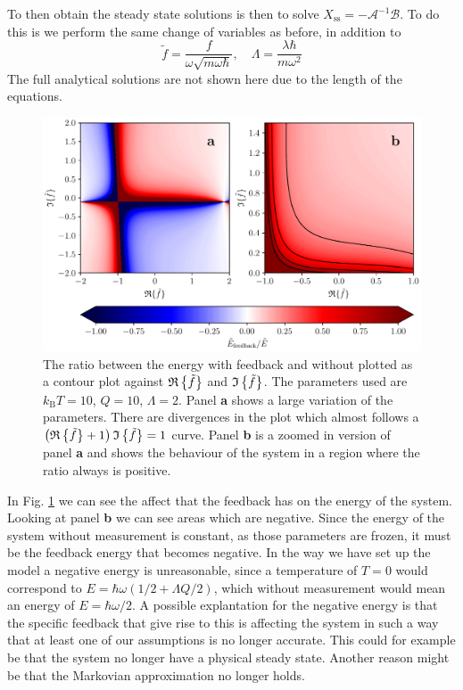 To then obtain the steady state solutions is then to solve $X_\text{ss} = - \mathcal{A}^{-1} \mathcal{B}$. To do this is we perform the same change of variables as before, in addition to
\begin{equation}
    \tilde{f} = \frac{f}{\omega \sqrt{m \omega \hbar}} , \quad \Lambda = \frac{\lambda \hbar}{m \omega^2}
\end{equation}
The full analytical solutions are not shown here due to the length of the equations.

\begin{figure}
    \centering
    \includegraphics[width=\textwidth]{figures/energyFeedbackRatio.pdf}
    \caption{\small The ratio between the energy with feedback and without plotted as a contour plot against $\mathfrak{R}\left\{\tilde{f}\right\}$ and $\mathfrak{I}\left\{\tilde{f}\right\}$. The parameters used are $k_\text{B}T = 10$, $Q = 10$, $\Lambda = 2$. Panel \textbf{a} shows a large variation of the parameters. There are divergences in the plot which almost follows a $\left(\mathfrak{R}\left\{\tilde{f}\right\} + 1 \right)\mathfrak{I}\left\{\tilde{f}\right\} = 1$ curve. Panel \textbf{b} is a zoomed in version of panel \textbf{a} and shows the behaviour of the system in a region where the ratio always is positive.}
    \label{fig:energyFeedbackRatio}
\end{figure}
In Fig. \ref{fig:energyFeedbackRatio} we can see the affect that the feedback has on the energy of the system. Looking at panel \textbf{b} we can see areas which are negative. Since the energy of the system without measurement is constant, as those parameters are frozen, it must be the feedback energy that becomes negative. In the way we have set up the model a negative energy is unreasonable, since a temperature of $T=0$ would correspond to $E =\hbar\omega( 1/2 + \Lambda Q/2)$, which without measurement would mean an energy of $E = \hbar\omega/2$. A possible explantation for the negative energy is that the specific feedback that give rise to this is affecting the system in such a way that at least one of our assumptions is no longer accurate. This could for example be that the system no longer have a physical steady state. Another reason might be that the Markovian approximation no longer holds.

